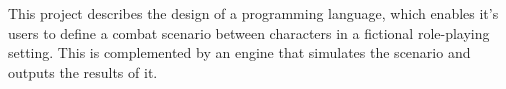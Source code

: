 This project describes the design of a programming language, which enables it's users to define a combat scenario between characters in a fictional role-playing setting. This is complemented by an engine that simulates the scenario and outputs the results of it.
